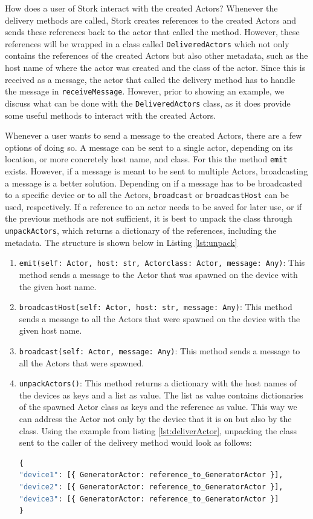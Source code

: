 \documentclass[a4paper]{article}
\begin{document}
How does a user of Stork interact with the created Actors? Whenever the delivery methods are called, Stork creates references to the created Actors and sends these references back to the actor that called the method. However, these references will be wrapped in a class called \lstinline|DeliveredActors| which not only contains the references of the created Actors but also other metadata, such as the host name of where the actor was created and the class of the actor. Since this is received as a message, the actor that called the delivery method has to handle the message in \lstinline|receiveMessage|. However, prior to showing an example, we discuss what can be done with the \lstinline|DeliveredActors| class, as it does provide some useful methods to interact with the created Actors.

Whenever a user wants to send a message to the created Actors, there are a few options of doing so. A message can be sent to a single actor, depending on its location, or more concretely host name, and class. For this the method \lstinline|emit| exists. However, if a message is meant to be sent to multiple Actors, broadcasting a message is a better solution. Depending on if a message has to be broadcasted to a specific device or to all the Actors, \lstinline|broadcast| or \lstinline|broadcastHost| can be used, respectively. If a reference to an actor needs to be saved for later use, or if the previous methods are not sufficient, it is best to unpack the class through \lstinline|unpackActors|, which returns a dictionary of the references, including the metadata. The structure is shown below in Listing \ref{lst:unpack}
\begin{enumerate}
    \item \lstinline{emit(self: Actor, host: str, Actorclass: Actor, message: Any)}: This method sends a message to the Actor that was spawned on the device with the given host name.
    \item \lstinline{broadcastHost(self: Actor, host: str, message: Any)}: This method sends a message to all the Actors that were spawned on the device with the given host name.
    \item \lstinline{broadcast(self: Actor, message: Any)}: This method sends a message to all the Actors that were spawned.
    \item \lstinline{unpackActors()}: This method returns a dictionary with the host names of the devices as keys and a list as value. The list as value contains dictionaries of the spawned Actor class as keys and the reference as value. This way we can address the Actor not only by the device that it is on but also by the class. Using the example from listing \ref{lst:deliverActor}, unpacking the class sent to the caller of the delivery method would look as follows:
          \begin{lstlisting}[language=Python, caption=lst:Unpacking structure ,label=lst:unpack]
{
"device1": [{ GeneratorActor: reference_to_GeneratorActor }],
"device2": [{ GeneratorActor: reference_to_GeneratorActor }],
"device3": [{ GeneratorActor: reference_to_GeneratorActor }]
}
    \end{lstlisting}
\end{enumerate}
\end{document}
